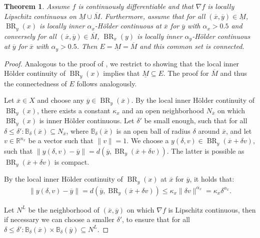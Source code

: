 \documentclass[10pt,a4paper]{amsart}
\newtheorem{theorem}{Theorem}
\DeclareMathOperator{\BR}{BR}
\newcommand{\R}{\mathbb{R}}
\begin{document}
\begin{theorem}
\label{thm:Holderconnected}
Assume $f$ is continuously differentiable and that $\nabla f$ is locally Lipschitz continuous on $\underline{M}\cup\overline{M}$. Furthermore, assume that for all $(\overline{x},\overline{y})\in \underline{M}$, $\BR_y(x)$ is locally inner $\alpha_x$-Hölder continuous at $\overline{x}$ for $\overline{y}$ with $\alpha_x>0.5$ and conversely for all $(\overline{x},\overline{y})\in \overline{M}$, $\BR_x(y)$ is locally inner $\alpha_y$-Hölder continuous at $\overline{y}$ for $\overline{x}$ with $\alpha_y>0.5$. Then $E=\underline{M}=\overline{M}$ and this common set is connected.
\end{theorem}

\begin{proof}
    Analogous to the proof of , we restrict to showing that the local inner Hölder continuity of $\BR_y(x)$ implies that $\underline{M} \subseteq E$. The proof for $\overline{M}$ and thus the connectedness of $E$ follows analogously.

    Let $\overline{x}\in X$ and choose any $\overline{y}\in \BR_y(\overline{x})$. By the local inner Hölder continuity of $\BR_y(x)$, there exists a constant $\kappa_x$ and an open neighborhood $N_{\overline{x}}$ on which $\BR_y(x)$ is inner Hölder continuous. Let $\delta'$ be small enough, such that for all $\delta\leq \delta': \mathbb{B}_\delta (\overline{x})\subseteq N_{\overline{x}}$, where $\mathbb{B}_\delta (\overline{x})$ is an open ball of radius $\delta$ around $\overline{x}$, and let $v \in \R^{n_x}$ be a vector such that $\|v\|=1$. We choose a $y(\delta,v) \in \BR_y(\overline{x}+\delta v)$, such that $\|y(\delta,v)-\overline{y}\|=d(\overline{y},\BR_y(\overline{x}+\delta v))$. The latter is possible as $\BR_y(\overline{x}+\delta v)$ is compact.

    By the local inner Hölder continuity of $\BR_y({x})$ at $\overline{x}$ for $\overline{y}$, it holds that:
    \begin{align*}
       \|y(\delta,v)-\overline{y}\| =d(\overline{y},\BR_y(\overline{x}+\delta v)) \leq \kappa_x \|\delta v\|^{\alpha_x} = \kappa_x \delta^{\alpha_x}.
    \end{align*}

    Let $N^L$ be the neighborhood of $(\overline{x},\overline{y})$ on which $\nabla f$ is Lipschitz continuous, then if necessary we can choose a smaller $\delta'$, to ensure that for all $\delta\leq \delta': \mathbb{B}_\delta (\overline{x})\times \mathbb{B}_\delta (\overline{y})\subseteq N^L$. 
    


\end{proof}
\end{document}
